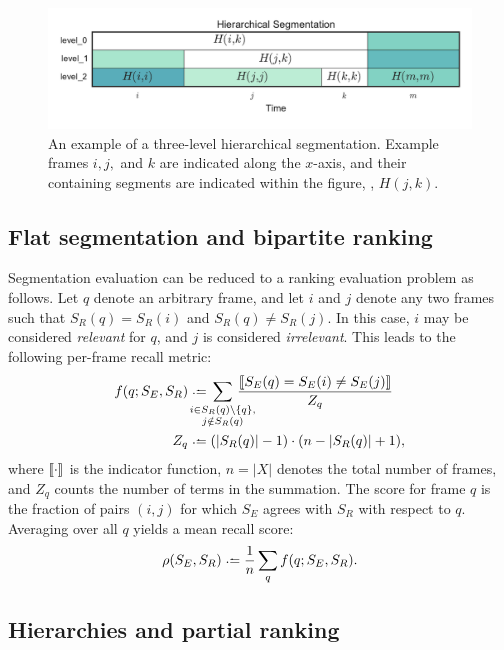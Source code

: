\documentclass{article}
\begin{document}
\begin{figure}
  \centering
  \includegraphics[width=\columnwidth]{figs/hier-example.pdf}
  \caption{An example of a three-level hierarchical segmentation.
  Example frames $i, j,$ and $k$ are indicated along the $x$-axis, and their containing segments are indicated
  within the figure, \eg, $H(j, k)$.}
  \label{fig:hier-example}
\end{figure}


\subsection{Flat segmentation and bipartite ranking}

Segmentation evaluation can be reduced to a ranking evaluation problem as follows.
Let $q$ denote an arbitrary frame, and let $i$ and $j$ denote any two frames such that $S_R(q) = S_R(i)$ and $S_R(q) \neq S_R(j)$.
In this case, $i$ may be considered \emph{relevant} for $q$, and $j$ is considered \emph{irrelevant}.
This leads to the following per-frame recall metric:
\begin{align}
f(q ; S_E, S_R) &\defeq  \hspace{-1.5em} \sum_{\substack{i \in S_R(q) \setminus \{q\},\\ j \notin S_R(q)}}
\hspace{-1.5em}\frac{\ind{S_E(q) = S_E(i) \neq S_E(j) }}{Z_q} \label{flatrecall}\\
Z_q &\defeq (|S_R(q)| - 1)\cdot (n - |S_R(q)| + 1), \notag
\end{align}
where $\left\llbracket\cdot\right\rrbracket$ is the indicator function, $n = |X|$ denotes the total number of frames, and $Z_q$
counts the number of terms in the summation.
The score for frame $q$ is the fraction of pairs $(i, j)$ for which $S_E$
agrees with $S_R$ with respect to $q$.
Averaging over all $q$ yields a mean recall score:
\begin{equation}
\rho(S_E, S_R) \defeq \frac{1}{n} \sum_q f(q ; S_E, S_R).\label{avgrecall}
\end{equation}


\subsection{Hierarchies and partial ranking}
\end{document}
